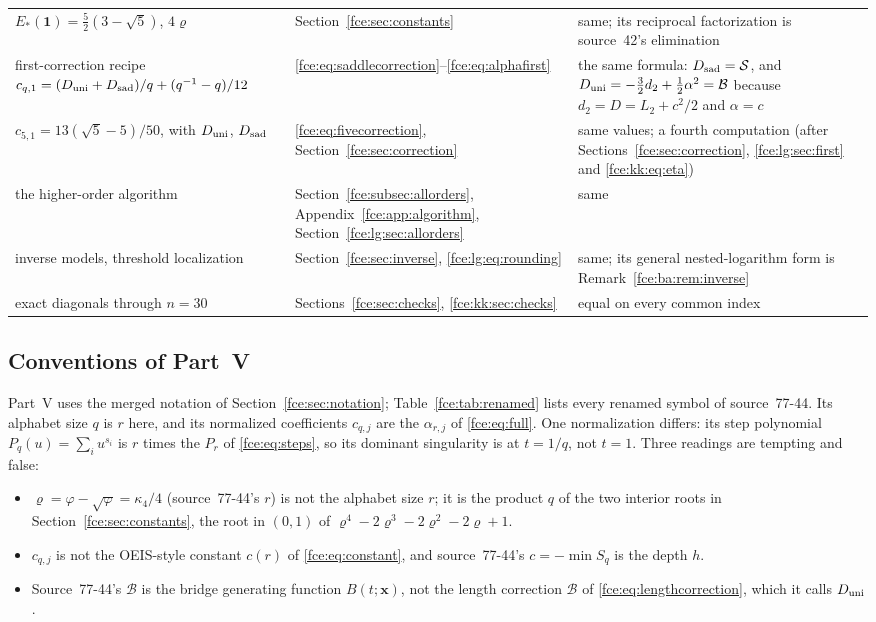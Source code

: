 \documentclass[11pt,a4paper]{article}
\numberwithin{equation}{section}
\theoremstyle{definition}\newtheorem{definition}[theorem]{Definition}
\theoremstyle{remark}\newtheorem{remark}[theorem]{Remark}
\begin{document}
{\begin{longtable}{@{}>{\raggedright\arraybackslash}p{}>{\raggedright\arraybackslash}p{}>{\raggedright\arraybackslash}p{}@{}}
$E_*(\boldsymbol1)=\frac52(3-\sqrt5)$, $4\varrho$ & Section~\ref{fce:sec:constants}
 & same; its reciprocal factorization is source~42's elimination\\
first-correction recipe $c_{q,1}=(D_{\rm uni}+D_{\rm sad})/q+(q^{-1}-q)/12$ &
 \eqref{fce:eq:saddlecorrection}--\eqref{fce:eq:alphafirst} & the same
 formula: $D_{\rm sad}=\mathcal S$, and $D_{\rm uni}=-\frac32d_2+\frac12\alpha^2
 =\mathcal B$ because $d_2=D=L_2+c^2/2$ and $\alpha=c$\\
$c_{5,1}=13(\sqrt5-5)/50$, with $D_{\rm uni}$, $D_{\rm sad}$ &
 \eqref{fce:eq:fivecorrection}, Section~\ref{fce:sec:correction} & same
 values; a fourth computation (after Sections~\ref{fce:sec:correction},
 \ref{fce:lg:sec:first} and \eqref{fce:kk:eq:eta})\\
the higher-order algorithm & Section~\ref{fce:subsec:allorders},
 Appendix~\ref{fce:app:algorithm}, Section~\ref{fce:lg:sec:allorders} & same\\
inverse models, threshold localization & Section~\ref{fce:sec:inverse},
 \eqref{fce:lg:eq:rounding} & same; its general nested-logarithm form is
 Remark~\ref{fce:ba:rem:inverse}\\
exact diagonals through $n=30$ & Sections~\ref{fce:sec:checks},
 \ref{fce:kk:sec:checks} & equal on every common index\\
\end{longtable}}

\subsection{Conventions of Part~V}\label{fce:ba:sec:conventions}
Part~V uses the merged notation of Section~\ref{fce:sec:notation};
Table~\ref{fce:tab:renamed} lists every renamed symbol of source~77-44. Its
alphabet size $q$ is $r$ here, and its normalized coefficients $c_{q,j}$ are
the $\alpha_{r,j}$ of \eqref{fce:eq:full}. One normalization differs: its
step polynomial $P_q(u)=\sum_iu^{s_i}$ is $r$ times the $P_r$ of
\eqref{fce:eq:steps}, so its dominant singularity is at $t=1/q$, not $t=1$.
Three readings are tempting and false:
\begin{itemize}
\item $\varrho=\varphi-\sqrt\varphi=\kappa_4/4$ (source~77-44's $r$) is not
the alphabet size $r$; it is the product $q$ of the two interior roots in
Section~\ref{fce:sec:constants}, the root in $(0,1)$ of
$\varrho^4-2\varrho^3-2\varrho^2-2\varrho+1$.
\item $c_{q,j}$ is not the OEIS-style constant $c(r)$ of
\eqref{fce:eq:constant}, and source~77-44's $c=-\min S_q$ is the depth $h$.
\item Source~77-44's $\mathcal B$ is the bridge generating function
$B(t;\boldsymbol x)$, not the length correction $\mathcal B$ of
\eqref{fce:eq:lengthcorrection}, which it calls $D_{\rm uni}$.
\end{itemize}
\end{document}

